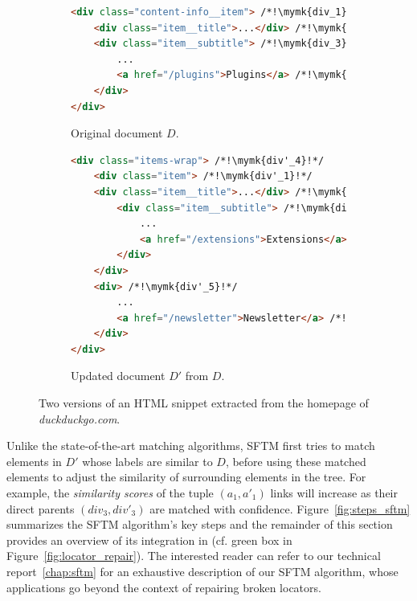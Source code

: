 \begin{figure}
    \centering
    \begin{subfigure}[b]{\linewidth}
        \centering
        \caption{Original document $D$.}
        \begin{lstlisting}[language=html, label={fig:first_version}]
<div class="content-info__item"> /*!\mymk{div_1}!*/
    <div class="item__title">...</div> /*!\mymk{div_2}!*/
    <div class="item__subtitle"> /*!\mymk{div_3}!*/
        ... 
        <a href="/plugins">Plugins</a> /*!\mymk{~a_1~}!*/
    </div>
</div>
        \end{lstlisting}
    \end{subfigure}
    \hfill
    \begin{subfigure}[b]{\linewidth}
        \centering
        \caption{Updated document $D'$ from $D$.}
        \begin{lstlisting}[language=html, label={fig:second_version}]
<div class="items-wrap"> /*!\mymk{div'_4}!*/
    <div class="item"> /*!\mymk{div'_1}!*/
    <div class="item__title">...</div> /*!\mymk{div'_2}!*/
        <div class="item__subtitle"> /*!\mymk{div'_3}!*/
            ... 
            <a href="/extensions">Extensions</a> /*!\mymk{~a'_1~}!*/
        </div>
    </div>
    <div> /*!\mymk{div'_5}!*/  
        ...
        <a href="/newsletter">Newsletter</a> /*!\mymk{~a'_2~}!*/
    </div>
</div>
        \end{lstlisting}
    \end{subfigure}
    \caption{Two versions of an HTML snippet extracted from the homepage of \emph{duckduckgo.com}.}
    \label{fig:example_html}
\end{figure}

Unlike the state-of-the-art matching algorithms, SFTM first tries to match elements in $D'$ whose labels are similar to $D$, before using these matched elements to adjust the similarity of surrounding elements in the tree.
For example, the \emph{similarity scores} of the tuple $(a_1,a'_1)$ links will increase as their direct parents $(div_3,div'_3)$ are matched with confidence.
% 
Figure~\ref{fig:steps_sftm} summarizes the SFTM algorithm's key steps and the remainder of this section provides an overview of its integration in \erratum{} (cf. green box in Figure~\ref{fig:locator_repair}).
The interested reader can refer to our technical report~\ref{chap:sftm} for an exhaustive description of our SFTM algorithm, whose applications go beyond the context of repairing broken locators.

